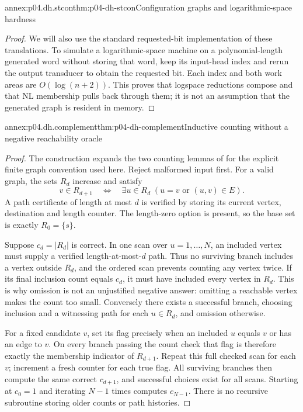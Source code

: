 \begin{annexitem}{annex:p04.dh.stcon}{thm:p04-dh-stcon}{Configuration graphs and logarithmic-space hardness}
\begin{proof}
We will also use the standard requested-bit implementation of these
translations. To simulate a logarithmic-space machine on a
polynomial-length generated word without storing that word, keep its
input-head index and rerun the output transducer to obtain the requested
bit. Each index and both work areas are \(O(\log(n+2))\). This proves that
logspace reductions compose and that NL membership pulls back through
them; it is not an assumption that the generated graph is resident in memory.
\end{proof}
\end{annexitem}

\begin{annexitem}{annex:p04.dh.complement}{thm:p04-dh-complement}{Inductive counting without a negative reachability oracle}
\begin{proof}
The construction expands the two counting lemmas of
\cite[theorem 1 and lemmas 1--2]{Immerman1988Complement} for the explicit
finite graph convention used here. Reject malformed input first. For
a valid graph, the sets \(R_d\) increase and satisfy
\[
 v\in R_{d+1}\quad\Longleftrightarrow\quad
 \exists u\in R_d\;(u=v\text{ or }(u,v)\in E).
\]
A path certificate of length at most \(d\) is verified by storing its
current vertex, destination and length counter. The length-zero option
is present, so the base set is exactly \(R_0=\{s\}\).

Suppose \(c_d=|R_d|\) is correct. In one scan over \(u=1,\ldots,N\),
an included vertex must supply a verified length-at-most-\(d\) path.
Thus no surviving branch includes a vertex outside \(R_d\), and the
ordered scan prevents counting any vertex twice. If its final inclusion
count equals \(c_d\), it must have included every vertex in \(R_d\).
This is why omission is not an unjustified negative answer: omitting a
reachable vertex makes the count too small. Conversely there exists a
successful branch, choosing inclusion and a witnessing path for each
\(u\in R_d\), and omission otherwise.

For a fixed candidate \(v\), set its flag precisely when an included
\(u\) equals \(v\) or has an edge to \(v\). On every branch passing the
count check that flag is therefore exactly the membership indicator
of \(R_{d+1}\). Repeat this full checked scan for each \(v\); increment
a fresh counter for each true flag. All surviving branches then compute
the same correct \(c_{d+1}\), and successful choices exist for all scans.
Starting at \(c_0=1\) and iterating \(N-1\) times computes \(c_{N-1}\).
There is no recursive subroutine storing older counts or path histories.


\end{proof}
\end{annexitem}
